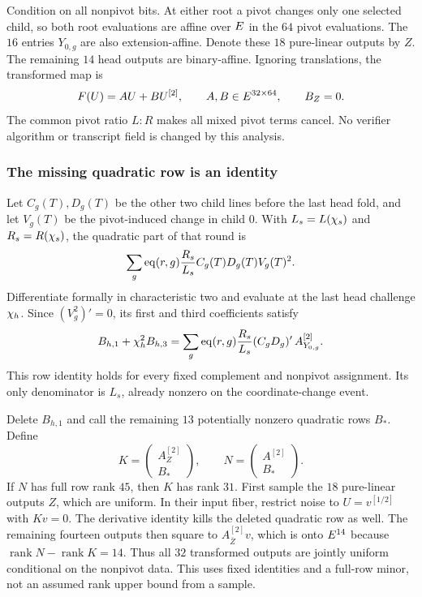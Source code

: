 Condition on all nonpivot bits. At either root a pivot changes only one selected child, so both root evaluations are affine over $E$ in the $64$ pivot evaluations. The $16$ entries $Y_{0,g}$ are also extension-affine. Denote these $18$ pure-linear outputs by $Z$. The remaining $14$ head outputs are binary-affine. Ignoring translations, the transformed map is
\[
 F(U)=AU+BU^{[2]},\qquad A,B\in E^{32\times64},
 \qquad B_Z=0.
\]
The common pivot ratio $L:R$ makes all mixed pivot terms cancel. No verifier algorithm or transcript field is changed by this analysis.

\subsubsection{The missing quadratic row is an identity}

Let $C_g(T),D_g(T)$ be the other two child lines before the last head fold, and let $V_g(T)$ be the pivot-induced change in child $0$. With $L_s=L(\chi_s)$ and $R_s=R(\chi_s)$, the quadratic part of that round is
\[
 \sum_g\operatorname{eq}(r,g)\frac{R_s}{L_s}C_g(T)D_g(T)V_g(T)^2.
\]
Differentiate formally in characteristic two and evaluate at the last head challenge $\chi_h$. Since $(V_g^2)'=0$, its first and third coefficients satisfy
\[
 B_{h,1}+\chi_h^2 B_{h,3}
 =\sum_g\operatorname{eq}(r,g)\frac{R_s}{L_s}(C_gD_g)'\,A_{Y_{0,g}}^{[2]}.
\]
This row identity holds for every fixed complement and nonpivot assignment. Its only denominator is $L_s$, already nonzero on the coordinate-change event.

Delete $B_{h,1}$ and call the remaining $13$ potentially nonzero quadratic rows $B_*$. Define
\[
 K=\begin{pmatrix}A_Z^{[2]}\\B_*\end{pmatrix},
 \qquad
 N=\begin{pmatrix}A^{[2]}\\B_*\end{pmatrix}.
\]
If $N$ has full row rank $45$, then $K$ has rank $31$. First sample the $18$ pure-linear outputs $Z$, which are uniform. In their input fiber, restrict noise to $U=v^{[1/2]}$ with $Kv=0$. The derivative identity kills the deleted quadratic row as well. The remaining fourteen outputs then square to $A_{\overline Z}^{[2]}v$, which is onto $E^{14}$ because $\operatorname{rank}N-\operatorname{rank}K=14$. Thus all $32$ transformed outputs are jointly uniform conditional on the nonpivot data. This uses fixed identities and a full-row minor, not an assumed rank upper bound from a sample.

